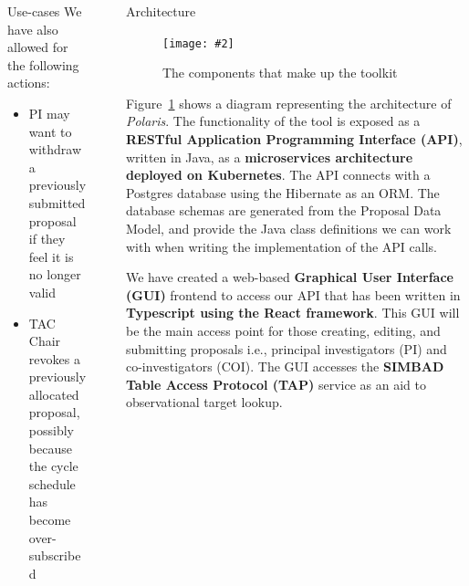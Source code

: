 \documentclass[final]{beamer}
\newlength{\sepwidth}
\newlength{\colwidth}
\newcommand{\separatorcolumn}{\begin{column}{\sepwidth}\end{column}}
\newcommand{\insertFigure}[3][width=1.0\textwidth]{%
    \begin{figure}[ht]
    \centering
    \texttt{[image: \#2]}
    \caption{#3}
    \label{fig:#2}
    \end{figure}
}
\begin{document}
\begin{frame}[t]
\begin{columns}[t]
\begin{column}{\colwidth}
\begin{block}{Use-cases}
                    We have also allowed for the following actions:

                    \begin{itemize}
                        \item PI may want to withdraw a previously submitted proposal if they feel it is no longer valid
                        \item TAC Chair revokes a previously allocated proposal, possibly because the cycle schedule has become over-subscribed
                    \end{itemize}

                \end{block}

            \end{column}

            \separatorcolumn

            \begin{column}{\colwidth}

                \begin{block}{Architecture}

                    \insertFigure[width=30cm,height=35cm]{architecture}{The components that make up the toolkit}

                    Figure~\ref{fig:architecture} shows a diagram representing the architecture of \emph{Polaris}.
                    The functionality of the tool is exposed as a \textbf{RESTful Application Programming Interface (API)},
                    written in Java, as a \textbf{microservices architecture deployed on Kubernetes}.
                    The API connects with a Postgres database using the Hibernate as an ORM.
                    The database schemas are generated from the Proposal Data Model, and provide the Java class
                    definitions we can work with when writing the implementation of the API calls.

                    We have created a web-based \textbf{Graphical User Interface (GUI)} frontend to access our API
                    that has been written in \textbf{Typescript using the React framework}.
                    This GUI will be the main access point for those creating, editing, and submitting proposals i.e.,
                    principal investigators (PI) and co-investigators (COI).
                    The GUI accesses the \textbf{SIMBAD Table Access Protocol (TAP)} service as an aid to observational
                    target lookup.


\end{block}
\end{column}
\end{columns}
\end{frame}
\end{document}
